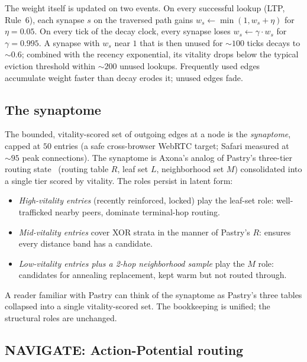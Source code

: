 \documentclass[conference]{IEEEtran}
\newcommand{\axona}{Axona\xspace}
\begin{document}
The weight itself is updated on two events. On every successful lookup
(LTP, Rule~6), each synapse $s$ on the traversed path gains $w_s
\leftarrow \min(1, w_s + \eta)$ for $\eta = 0.05$. On every tick of the
decay clock, every synapse loses $w_s \leftarrow \gamma \cdot w_s$ for
$\gamma = 0.995$. A synapse with $w_s$ near $1$ that is then unused for
$\sim\!100$ ticks decays to $\sim\!0.6$; combined with the recency
exponential, its vitality drops below the typical eviction threshold
within $\sim\!200$ unused lookups. Frequently used edges accumulate
weight faster than decay erodes it; unused edges fade.

\subsection{The synaptome}
\label{sec:nh1-synaptome}

The bounded, vitality-scored set of outgoing edges at a node is the
\emph{synaptome}, capped at $50$ entries (a safe cross-browser WebRTC
target; Safari measured at $\sim\!95$ peak connections). The synaptome is
\axona's analog of Pastry's three-tier routing
state~\cite{rowstron2001pastry} (routing table $R$, leaf set $L$,
neighborhood set $M$) consolidated into a single tier scored by vitality.
The roles persist in latent form:

\begin{itemize}
\item \emph{High-vitality entries} (recently reinforced, locked) play the
leaf-set role: well-trafficked nearby peers, dominate terminal-hop routing.
\item \emph{Mid-vitality entries} cover XOR strata in the manner of
Pastry's $R$: ensures every distance band has a candidate.
\item \emph{Low-vitality entries plus a 2-hop neighborhood sample} play the
$M$ role: candidates for annealing replacement, kept warm but not routed
through.
\end{itemize}

\noindent
A reader familiar with Pastry can think of the synaptome as Pastry's three
tables collapsed into a single vitality-scored set. The bookkeeping is
unified; the structural roles are unchanged.

\subsection{NAVIGATE: Action-Potential routing}
\label{sec:nh1-navigate}
\end{document}
